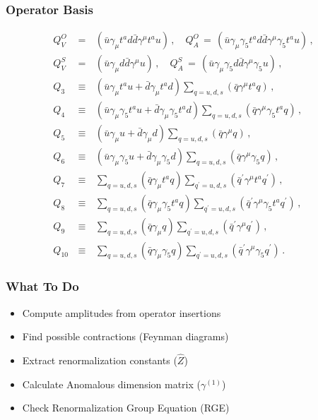 \documentclass{beamer}
\begin{document}
\begin{frame}
\frametitle{Operator Basis}
\tiny
\begin{eqnarray*}
	Q_V^{O} \,&=&\, (\bar u\gamma_\mu t^a d\bar d\gamma^\mu t^a u) \,, \quad
	Q_A^{O} \,=\, (\bar u\gamma_\mu\gamma_5 t^a d\bar d\gamma^\mu\gamma_5 t^a u)
	\,,\\
	Q_V^{S} \,&=&\, (\bar u\gamma_\mu d\bar d\gamma^\mu u) \,, \quad
	Q_A^{S} \,=\, (\bar u\gamma_\mu\gamma_5 d\bar d\gamma^\mu\gamma_5 u) \,, \\
	Q_3 \,&\equiv&\, (\bar u\gamma_\mu t^a u + \bar d\gamma_\mu t^a d)
	\!\sum\limits_{q=u,d,s} (\bar q\gamma^\mu t^a q) \,, \\
	Q_4 \,&\equiv&\, (\bar u\gamma_\mu\gamma_5 t^a u +
	                  \bar d\gamma_\mu\gamma_5 t^a d)
	\!\sum\limits_{q=u,d,s} (\bar q\gamma^\mu\gamma_5 t^a q) \,, \\
	Q_5 \,&\equiv&\, (\bar u\gamma_\mu u + \bar d\gamma_\mu d)
	\!\sum\limits_{q=u,d,s} (\bar q\gamma^\mu q) \,, \\
	Q_6 \,&\equiv&\, (\bar u\gamma_\mu\gamma_5 u + \bar d\gamma_\mu\gamma_5 d)
	\!\sum\limits_{q=u,d,s} (\bar q\gamma^\mu\gamma_5 q) \,, \\
	Q_7 \,&\equiv&\, \sum\limits_{q=u,d,s} (\bar q\gamma_\mu t^a q)
	\!\sum\limits_{q^\prime=u,d,s} (\bar q^\prime\gamma^\mu t^a q^\prime) \,, \\
	Q_8 \,&\equiv&\, \sum\limits_{q=u,d,s} (\bar q\gamma_\mu\gamma_5 t^a q)
	\!\sum\limits_{q^\prime=u,d,s} (\bar q^\prime\gamma^\mu\gamma_5 t^a q^\prime)
	\,, \\
	Q_9 \,&\equiv&\, \sum\limits_{q=u,d,s} (\bar q\gamma_\mu q)
	\!\sum\limits_{q^\prime=u,d,s} (\bar q^\prime\gamma^\mu q^\prime) \,, \\
	Q_{10} \,&\equiv&\, \sum\limits_{q=u,d,s} (\bar q\gamma_\mu\gamma_5 q)
	\!\sum\limits_{q^\prime=u,d,s} (\bar q^\prime\gamma^\mu\gamma_5 q^\prime) \,.
\end{eqnarray*} 
\end{frame}

\begin{frame}
\frametitle{What To Do}
\begin{itemize}
\item Compute amplitudes from operator insertions
\item Find possible contractions (Feynman diagrams) 
\item Extract renormalization constants ($ \hat Z$)
\item Calculate Anomalous dimension matrix ($\gamma^{(1)}$)
\item Check Renormalization Group Equation (RGE)
\end{itemize}
\end{frame}
\end{document}
